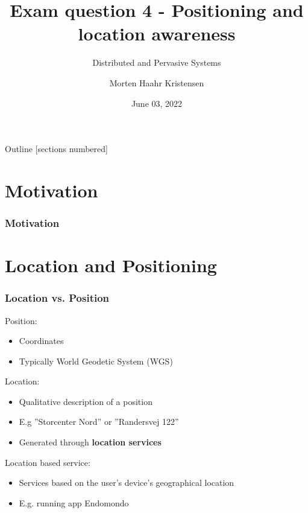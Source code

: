 \documentclass[10pt]{beamer}
\title[Positioning and location awareness]{Exam question 4 - Positioning and location awareness}
\subtitle{Distributed and Pervasive Systems}
\date{June 03, 2022}
\author[M.H. Kristensen]{Morten Haahr Kristensen}
\institute{Department of Electrical and Computer Engineering - Aarhus University}
\begin{document}
\maketitle

\begin{frame}{Outline}
  [sections numbered]
  \tableofcontents[hideallsubsections]
\end{frame}

\section{Motivation}

\begin{frame}
  \frametitle{Motivation}

  

\end{frame}

\section{Location and Positioning}

\begin{frame}
  \frametitle{Location vs. Position}

  Position:
  \vspace*{-0.7em}
  \begin{itemize}
    \item Coordinates
    \item Typically World Geodetic System (WGS)
  \end{itemize}

  Location:
  \vspace*{-0.7em}
  \begin{itemize}
    \item Qualitative description of a position
    \item E.g ''Storcenter Nord'' or ''Randersvej 122''
    \item Generated through \textbf{location services}
  \end{itemize}

  Location based service:
  \vspace*{-0.7em}
  \begin{itemize}
    \item Services based on the user's device's geographical location
    \item E.g. running app Endomondo
  \end{itemize}

\end{frame}
\end{document}

